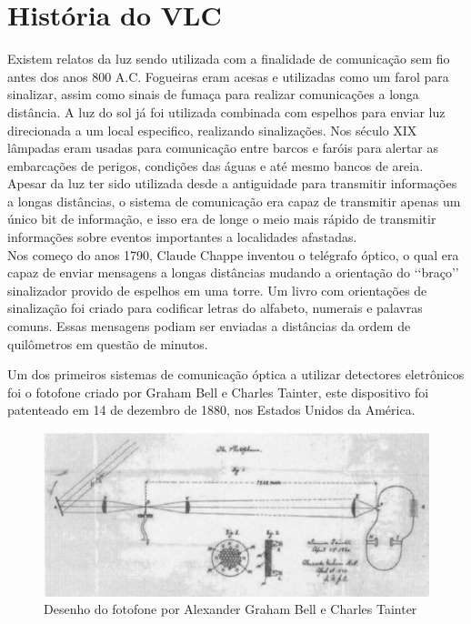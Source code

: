 
\chapter[HISTÓRICO]{História do VLC}

Existem relatos da luz sendo utilizada com a finalidade de comunicação sem fio antes
dos anos 800 A.C. Fogueiras eram acesas e utilizadas como um farol para sinalizar,
 assim como sinais de fumaça para realizar comunicações a longa distância. A luz do sol 
 já foi utilizada combinada com espelhos para enviar luz direcionada a um local especifico, realizando sinalizações. 
 Nos século XIX lâmpadas eram usadas para comunicação entre barcos e faróis para 
 alertar as embarcações de perigos, condições das águas e até mesmo bancos de areia.\\

Apesar da luz ter sido utilizada desde a antiguidade para transmitir informações a longas distâncias, o sistema de comunicação era capaz de transmitir apenas um único bit de informação, e isso era de longe o meio mais rápido de transmitir informações sobre eventos importantes a localidades afastadas.\\

Nos começo do anos 1790, Claude Chappe inventou o telégrafo óptico, o qual era capaz de enviar mensagens a longas distâncias mudando a orientação do \lq\lq braço\rq\rq \: sinalizador provido de espelhos em uma torre. Um livro com orientações de sinalização foi criado para codificar letras do alfabeto, numerais e palavras comuns. Essas mensagens podiam ser enviadas a distâncias da ordem de quilômetros em questão de minutos.\cite{Standage:1998}

Um dos primeiros sistemas de comunicação óptica a utilizar detectores eletrônicos foi o fotofone criado por Graham Bell e Charles Tainter, este dispositivo foi patenteado em 14 de dezembro de 1880, nos Estados Unidos da América.\cite{Azzawi} 

\begin{figure}
	\centering
	\label{Desenho do fotofone por Alexander Graham Bell e Charles Tainter}
		\includegraphics[width = 12cm]{figuras/fotofone.png}
	\caption{Desenho do fotofone por Alexander Graham Bell e Charles Tainter \cite{Hranilovic}}
\end{figure}

